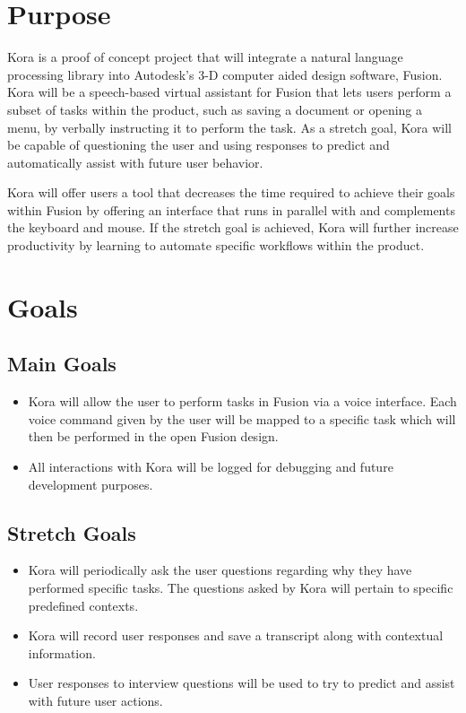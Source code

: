 \documentclass[onecolumn, draftclsnofoot,10pt, compsoc]{IEEEtran}
\begin{document}

\section{Purpose}
	Kora is a proof of concept project that will integrate a natural language processing library into Autodesk's 3-D computer aided design software, Fusion.
	Kora will be a speech-based virtual assistant for Fusion that lets users perform a subset of tasks within the product, such as saving a document or opening a menu, by verbally instructing it to perform the task.
	As a stretch goal, Kora will be capable of questioning the user and using responses to predict and automatically assist with future user behavior.
	
	Kora will offer users a tool that decreases the time required to achieve their goals within Fusion by offering an interface that runs in parallel with and complements the keyboard and mouse.
	If the stretch goal is achieved, Kora will further increase productivity by learning to automate specific workflows within the product.

\section{Goals}
	\subsection{Main Goals}
		\begin{itemize}
			 \item
		 	Kora will allow the user to perform tasks in Fusion via a voice interface.
			Each voice command given by the user will be mapped to a specific task which will then be performed in the open Fusion design.
			
			\item
			All interactions with Kora will be logged for debugging and future development purposes.
			
		\end{itemize}
	\subsection{Stretch Goals}
		\begin{itemize}
			\item
			Kora will periodically ask the user questions regarding why they have performed specific tasks.
			The questions asked by Kora will pertain to specific predefined contexts.
			
			\item
			Kora will record user responses and save a transcript along with contextual information.
			
			\item
			User responses to interview questions will be used to try to predict and assist with future user actions.
		\end{itemize}
\end{document}

